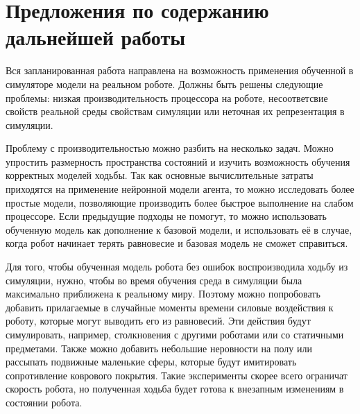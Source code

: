 \chapter{Предложения по содержанию дальнейшей работы}\label{ch:ch6}

Вся запланированная работа направлена на возможность применения обученной в симуляторе модели на реальном роботе. Должны быть решены следующие проблемы: низкая производительность процессора на роботе, несоответсвие свойств реальной среды свойствам симуляции или неточная их репрезентация в симуляции.

Проблему с производительностью можно разбить на несколько задач. Можно упростить размерность пространства состояний и изучить возможность обучения корректных моделей ходьбы. Так как основные вычислительные затраты приходятся на применение нейронной модели агента, то можно исследовать более простые модели, позволяющие производить более быстрое выполнение на слабом процессоре. Если предыдущие подходы не помогут, то можно использовать обученную модель как дополнение к базовой модели, и использовать её в случае, когда робот начинает терять равновесие и базовая модель не сможет справиться. 

Для того, чтобы обученная модель робота без ошибок воспроизводила ходьбу из симуляции, нужно, чтобы во время обучения среда в симуляции была максимально приближена к реальному миру. Поэтому можно попробовать добавить прилагаемые в случайные моменты времени силовые воздействия к роботу, которые могут выводить его из равновесий. Эти действия будут симулировать, например, столкновения с другими роботами или со статичными предметами. Также можно добавить небольшие неровности на полу или рассыпать подвижные маленькие сферы, которые будут имитировать сопротивление коврового покрытия. Такие эксперименты скорее всего ограничат скорость робота, но полученная ходьба будет готова к внезапным изменениям в состоянии робота. 